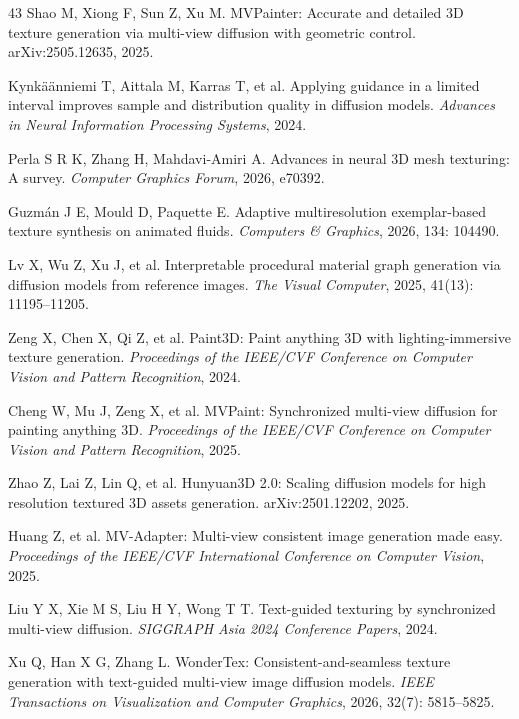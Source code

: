 \documentclass[times,twocolumn,final]{elsarticle}
\begin{document}
\begin{thebibliography}{43}
Shao M, Xiong F, Sun Z, Xu M. MVPainter: Accurate and detailed 3D texture generation via multi-view diffusion with geometric control. arXiv:2505.12635, 2025.

Kynk\"a\"anniemi T, Aittala M, Karras T, et al. Applying guidance in a limited interval improves sample and distribution quality in diffusion models. \textit{Advances in Neural Information Processing Systems}, 2024.

Perla S R K, Zhang H, Mahdavi-Amiri A. Advances in neural 3D mesh texturing: A survey. \textit{Computer Graphics Forum}, 2026, e70392.

Guzm\'an J E, Mould D, Paquette E. Adaptive multiresolution exemplar-based texture synthesis on animated fluids. \textit{Computers \& Graphics}, 2026, 134: 104490.

Lv X, Wu Z, Xu J, et al. Interpretable procedural material graph generation via diffusion models from reference images. \textit{The Visual Computer}, 2025, 41(13): 11195--11205.

Zeng X, Chen X, Qi Z, et al. Paint3D: Paint anything 3D with lighting-immersive texture generation. \textit{Proceedings of the IEEE/CVF Conference on Computer Vision and Pattern Recognition}, 2024.

Cheng W, Mu J, Zeng X, et al. MVPaint: Synchronized multi-view diffusion for painting anything 3D. \textit{Proceedings of the IEEE/CVF Conference on Computer Vision and Pattern Recognition}, 2025.

Zhao Z, Lai Z, Lin Q, et al. Hunyuan3D 2.0: Scaling diffusion models for high resolution textured 3D assets generation. arXiv:2501.12202, 2025.

Huang Z, et al. MV-Adapter: Multi-view consistent image generation made easy. \textit{Proceedings of the IEEE/CVF International Conference on Computer Vision}, 2025.

Liu Y X, Xie M S, Liu H Y, Wong T T. Text-guided texturing by synchronized multi-view diffusion. \textit{SIGGRAPH Asia 2024 Conference Papers}, 2024.

Xu Q, Han X G, Zhang L. WonderTex: Consistent-and-seamless texture generation with text-guided multi-view image diffusion models. \textit{IEEE Transactions on Visualization and Computer Graphics}, 2026, 32(7): 5815--5825.


\end{thebibliography}
\end{document}
